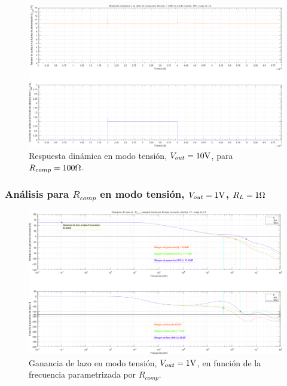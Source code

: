 \clearpage

\begin{figure}[H] %
\begin{center}
\includegraphics[width=1.1 \textwidth, angle=90]{./img/plots/dynamic/power_supply_RCOMP_100_STEP_Modo1.png}
\caption{\label{fig:fig_power_supply_RCOMP_STEP_20n_Modo1}\footnotesize{Respuesta dinámica en modo tensión, $V_{out} = 10 \si[per-mode=symbol]{\volt}$, para $R_{comp} = 100 \si[per-mode=symbol]{\ohm} $.}}
\end{center}
\end{figure}

\clearpage


\subsubsection{Análisis para $R_{comp}$ en modo tensión, $V_{out} = 1 \si[per-mode=symbol]{\volt}$, $R_{L} = 1 \si[per-mode=symbol]{\ohm}$}

\clearpage

\begin{figure}[H] %
\begin{center}
\includegraphics[width=1.1 \textwidth, angle=90]{./img/plots/loop/power_supply_RCOMP_LOOP_Modo2.png}
\caption{\label{fig:fig_power_supply_RCOMP_LOOP_Modo2}\footnotesize{Ganancia de lazo en modo tensión, $V_{out} = 1 \si[per-mode=symbol]{\volt}$, en función de la frecuencia parametrizada por $R_{comp}$.}}
\end{center}
\end{figure}



